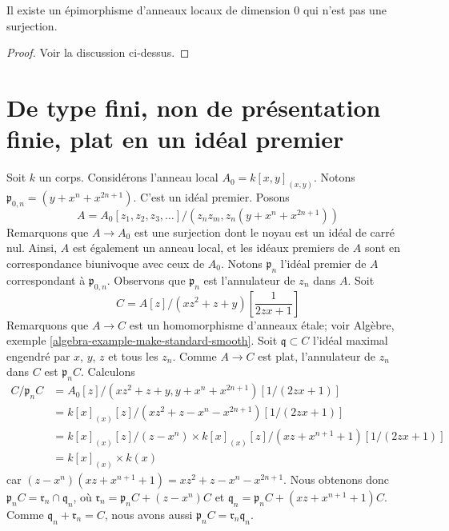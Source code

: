 \begin{lemma}
\label{lemma-epi-not-surjective}
Il existe un épimorphisme d'anneaux locaux de dimension $0$
qui n'est pas une surjection.
\end{lemma}

\begin{proof}
Voir la discussion ci-dessus.
\end{proof}



\section{De type fini, non de présentation finie, plat en un idéal premier}
\label{section-ft-not-fp-flat-at-prime}

\noindent
Soit $k$ un corps. Considérons l'anneau local $A_0 = k[x, y]_{(x, y)}$.
Notons $\mathfrak p_{0, n} = (y + x^n + x^{2n + 1})$. C'est un idéal premier.
Posons
$$
A = A_0[z_1, z_2, z_3, \ldots]/(z_n z_m, z_n(y + x^n + x^{2n + 1}))
$$
Remarquons que $A \to A_0$ est une surjection dont le noyau est un idéal de
carré nul. Ainsi, $A$ est également un anneau local, et les idéaux premiers de $A$
sont en correspondance biunivoque avec ceux de $A_0$.
Notons $\mathfrak p_n$ l'idéal premier de $A$ correspondant à
$\mathfrak p_{0, n}$. Observons que $\mathfrak p_n$ est l'annulateur
de $z_n$ dans $A$. Soit
$$
C = A[z]/(xz^2 + z + y)[\frac{1}{2zx + 1}]
$$
Remarquons que $A \to C$ est un homomorphisme d'anneaux \'etale; voir
Algèbre, exemple \ref{algebra-example-make-standard-smooth}.
Soit $\mathfrak q \subset C$ l'idéal maximal engendré par
$x$, $y$, $z$ et tous les $z_n$. Comme $A \to C$ est plat,
l'annulateur de $z_n$ dans $C$ est $\mathfrak p_nC$. Calculons
\begin{align*}
C/\mathfrak p_n C
& =
A_0[z]/(xz^2 + z + y, y + x^n + x^{2n + 1})[1/(2zx + 1)] \\
& =
k[x]_{(x)}[z]/(xz^2 + z - x^n - x^{2n + 1})[1/(2zx + 1)] \\
& =
k[x]_{(x)}[z]/(z - x^n) \times
k[x]_{(x)}[z]/(xz + x^{n + 1} + 1)[1/(2zx + 1)] \\
& =
k[x]_{(x)} \times k(x)
\end{align*}
car $(z - x^n)(xz + x^{n + 1} + 1) = xz^2 + z - x^n - x^{2n + 1}$.
Nous obtenons donc $\mathfrak p_nC = \mathfrak r_n \cap \mathfrak q_n$,
où $\mathfrak r_n = \mathfrak p_nC + (z - x^n)C$ et
$\mathfrak q_n = \mathfrak p_nC + (xz + x^{n + 1} + 1)C$.
Comme $\mathfrak q_n + \mathfrak r_n = C$, nous avons aussi
$\mathfrak p_nC = \mathfrak r_n \mathfrak q_n$.
